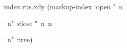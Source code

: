  
 
  
\begin{filecontents*}{index.rus.xdy}
(markup-index :open  "~n
\begin{theindex}
  \providecommand*\lettergroupDefault[1]{}
  \providecommand*\lettergroup[1]{%
    \textsf{#1}
    \nopagebreak
  }
  ~n"
  :close "~n~n\end{theindex}~n"
:tree)
\end{filecontents*}

 
